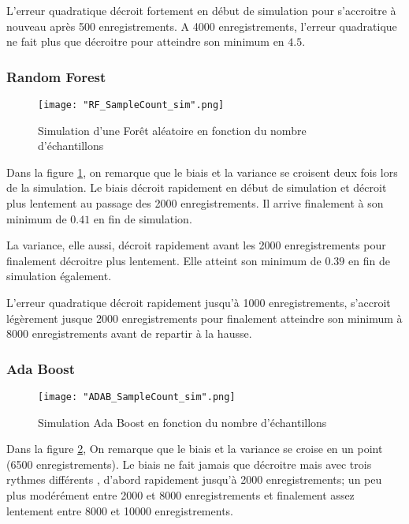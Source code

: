 \documentclass[a4paper]{article}
\begin{document}
L'erreur quadratique décroit fortement en début de simulation pour s'accroitre à nouveau après 500 enregistrements. A 4000 enregistrements, l'erreur quadratique ne fait plus que décroitre pour atteindre son minimum en $4.5$.

\newpage

\subsubsection{Random Forest}

\begin{figure}[!h]
	\centering
	\texttt{[image: "RF\_SampleCount\_sim".png]}
	\caption{Simulation d'une Forêt aléatoire en fonction du nombre d'échantillons}
	\label{RF_SampleCount}
\end{figure}

Dans la figure \ref{RF_SampleCount}, on remarque que le biais et la variance se croisent deux fois lors de la simulation. Le biais décroit rapidement en début de simulation et décroit plus lentement au passage des 2000 enregistrements. Il arrive finalement à son minimum de $0.41$ en fin de simulation. \newline

La variance, elle aussi, décroit rapidement avant les 2000 enregistrements pour finalement décroitre plus lentement. Elle atteint son minimum de $0.39$ en fin de simulation également. \newline

L'erreur quadratique décroit rapidement jusqu'à 1000 enregistrements, s'accroit légèrement jusque 2000 enregistrements pour finalement atteindre son minimum à 8000 enregistrements avant de repartir à la hausse.

\newpage

\subsubsection{Ada Boost}

\begin{figure}[!h]
	\centering
	\texttt{[image: "ADAB\_SampleCount\_sim".png]}
	\caption{Simulation Ada Boost en fonction du nombre d'échantillons}
	\label{ADAB_SampleCount}
\end{figure}

Dans la figure \ref{ADAB_SampleCount}, On remarque que le biais et la variance se croise en un point (6500 enregistrements). Le biais ne fait jamais que décroitre mais avec trois rythmes différents , d'abord rapidement jusqu'à 2000 enregistrements; un peu plus modérément entre 2000 et 8000 enregistrements et finalement assez lentement entre 8000 et 10000 enregistrements. \newline
\end{document}
